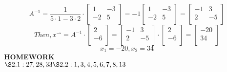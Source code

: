 \documentclass{article}
\begin{document}
\[ A^{-1}=\frac{1}{5{\cdot}1-3{\cdot}2}\cdot\left[ \begin{array}{cc}
                                                   1 & -3 \\
                                                   -2 & 5 \\
                                                   \end{array} \right]
=-1\left[ \begin{array}{cc}
          1 & -3 \\
          -2 & 5 \\
          \end{array} \right]
=\left[ \begin{array}{cc}
          -1 & 3 \\
          2 & -5 \\
          \end{array} \right] \]
\[
Then,
x^{\rightharpoonup}=A^{-1}\cdot\left[ \begin{array}{c}
                                     2 \\
                                     -6 \\
                                     \end{array}\right]
=\left[ \begin{array}{cc}
          -1 & 3 \\
          2 & -5 \\
          \end{array} \right]\cdot
\left[ \begin{array}{c}
       2 \\
       -6 \\
       \end{array}\right]
=\left[ \begin{array}{c}
       -20 \\
       34 \\
       \end{array}\right] \]
\[ x_1=-20, x_2=34 \]
\textbf{HOMEWORK}\\
$\S2.1: 27,28,33\\
\S2.2: 1,3,4,5,6,7,8,13$
\end{document}
